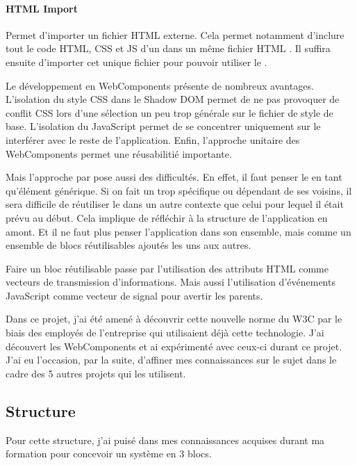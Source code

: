 \paragraph{HTML Import} Permet d'importer un fichier HTML externe.
Cela permet notamment d'inclure tout le code HTML, CSS et JS d'un \component dans un même fichier HTML .
Il suffira ensuite d'importer cet unique fichier pour pouvoir utiliser le \component.

\bigskip

Le développement en WebComponents présente de nombreux avantages.
L'isolation du style CSS dans le Shadow DOM permet de ne pas provoquer de conflit CSS lors d'une sélection un peu trop générale sur le fichier de style de base.
L'isolation du JavaScript permet de se concentrer uniquement sur le \component interférer avec le reste de l'application.
Enfin, l'approche unitaire des WebComponents permet une réusabilitié importante.

Mais l'approche par \component pose aussi des difficultés.
En effet, il faut penser le \component en tant qu'élément générique.
Si on fait un \component trop spécifique ou dépendant de ses voisins, il sera difficile de réutiliser le \component dans un autre contexte que celui pour lequel il était prévu au début.
Cela implique de réfléchir à la structure de l'application en amont.
Et il ne faut plus penser l'application dans son ensemble, mais comme un ensemble de blocs réutilisables ajoutés les uns aux autres.

Faire un bloc réutilisable passe par l'utilisation des attributs HTML comme vecteurs de transmission d'informations.
Mais aussi l'utilisation d'événements JavaScript comme vecteur de signal pour avertir les parents.

\bigskip

Dans ce projet, j'ai été amené à découvrir cette nouvelle norme du W3C par le biais des employés de l'entreprise qui utilisaient déjà cette technologie.
J'ai découvert les WebComponents et ai expérimenté avec ceux-ci durant ce projet.
J'ai eu l'occasion, par la suite, d'affiner mes connaissances sur le sujet dans le cadre des 5 autres projets qui les utilisent.

\subsection{Structure}

Pour cette structure, j'ai puisé dans mes connaissances acquises durant ma formation pour concevoir un système en 3 blocs.

